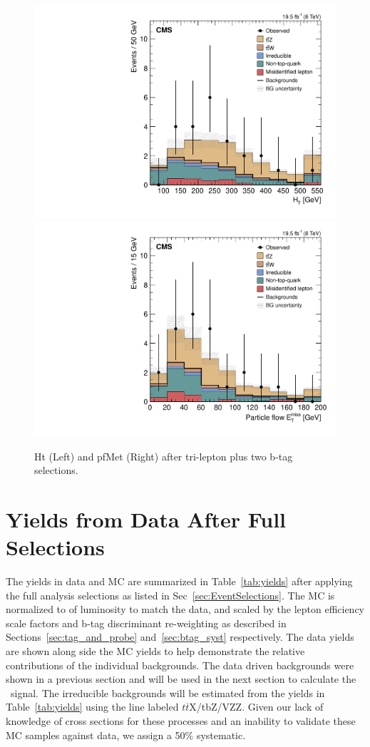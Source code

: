 \begin{figure}[h]
\begin{center}
\includegraphics[width=0.48\linewidth]{Figs/Plots_PreSelections/hHt_3L2b.pdf}
\includegraphics[width=0.48\linewidth]{Figs/Plots_PreSelections/hPFMet_3L2b.pdf}
\caption{\label{fig:hht_pfmet_3l}
Ht (Left) and pfMet (Right) after tri-lepton plus two b-tag selections.
}
\end{center}
\end{figure}







         
	\section{Yields from Data After Full Selections}
	The yields in data and MC are summarized in Table~\ref{tab:yields} after applying the full analysis selections as listed in Sec~\ref{sec:EventSelections}. The MC is normalized to \intLumi of luminosity to match the data, and scaled by the lepton efficiency scale factors and b-tag discriminant re-weighting as described in Sections~\ref{sec:tag_and_probe} and~\ref{sec:btag_syst} respectively. The data yields are shown along side the MC yields to help demonstrate the relative contributions of the individual backgrounds. The data driven backgrounds were shown in a previous section and will be used in the next section to calculate the \ttZ \ signal. The irreducible backgrounds will be estimated from the yields in Table~\ref{tab:yields} using the line labeled $t\overline{t}$X/tbZ/VZZ. Given our lack of knowledge of cross sections for these processes and an inability to validate these MC samples against data, we assign a 50\% systematic.

